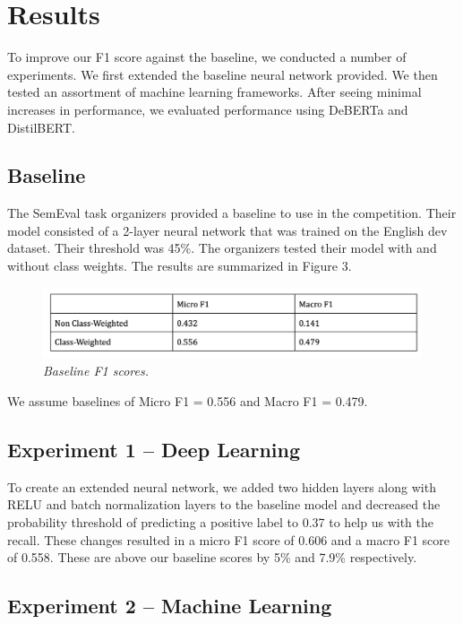 \documentclass[11pt]{article}
\begin{document}
\section{Results}

To improve our F1 score against the baseline, we conducted a number of experiments. We first extended the baseline neural network provided. We then tested an assortment of machine learning frameworks. After seeing minimal increases in performance, we evaluated performance using DeBERTa and DistilBERT.

\subsection{Baseline}

The SemEval task organizers provided a baseline to use in the competition. Their model consisted of a 2-layer neural network that was trained on the English dev dataset. Their threshold was 45\%. The organizers tested their model with and without class weights. The results are summarized in Figure 3. 


\begin{figure}
    \centering
    \includegraphics[width=\columnwidth]{baseline}
    \caption{\textit{Baseline F1 scores.}}
\end{figure}


We assume baselines of Micro F1 = 0.556 and Macro F1 = 0.479.

\subsection{Experiment 1 – Deep Learning}

To create an extended neural network, we added two hidden layers along with RELU and batch normalization layers to the baseline model and decreased the probability threshold of predicting a positive label to 0.37 to help us with the recall. These changes resulted in a micro F1 score of 0.606 and a macro F1 score of 0.558. These are above our baseline scores by 5\% and 7.9\% respectively.

\subsection{Experiment 2 – Machine Learning}
\end{document}
